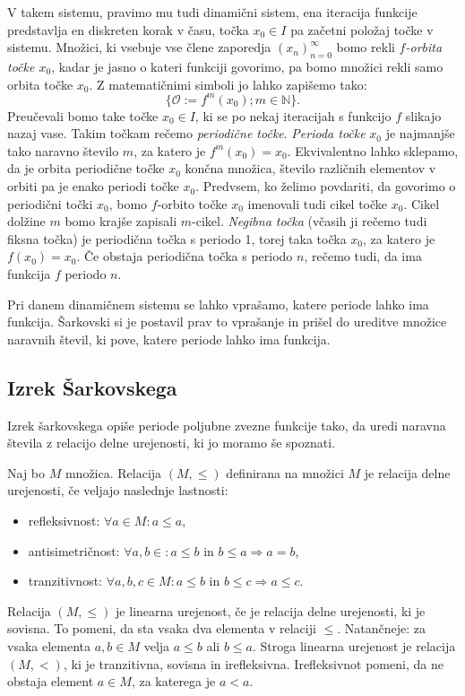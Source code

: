 \documentclass[mat2]{fmfdelo}
\newcommand{\N}{\mathbb N}
\begin{document}
V takem sistemu, pravimo mu tudi dinamični sistem, ena iteracija funkcije predstavlja en diskreten korak v času, točka $x_0 \in I$ pa začetni položaj točke v sistemu. Množici, ki vsebuje vse člene zaporedja $\left( x_n \right)_{n=0}^{\infty}$ bomo rekli \emph{$f$-orbita točke $x_0$}, kadar je jasno o kateri funkciji govorimo, pa bomo množici rekli samo orbita točke $x_0$. Z matematičnimi simboli jo lahko zapišemo tako:
$$\{ \mathcal{O} := f^m(x_0) ; m \in \N \}.$$
Preučevali bomo take točke $x_0 \in I$, ki se po nekaj iteracijah s funkcijo $f$ slikajo nazaj vase. Takim točkam rečemo \emph{periodične točke}. \emph{Perioda točke} $x_0$ je najmanjše tako naravno število $m$, za katero je $f^m(x_0) = x_0$. Ekvivalentno lahko sklepamo, da je orbita periodične točke $x_0$ končna množica, število različnih elementov v orbiti pa je enako periodi točke $x_0$. Predvsem, ko želimo povdariti, da govorimo o periodični točki $x_0$, bomo $f$-orbito točke $x_0$ imenovali tudi cikel točke $x_0$. Cikel dolžine $m$ bomo krajše zapisali $m$-cikel. \emph{Negibna točka} (včasih ji rečemo tudi fiksna točka) je periodična točka s periodo 1, torej taka točka $x_0$, za katero je $f(x_0) = x_0$. Če obstaja periodična točka s periodo $n$, rečemo tudi, da ima funkcija $f$ periodo $n$.

Pri danem dinamičnem sistemu se lahko vprašamo, katere periode lahko ima funkcija. Šarkovski si je postavil prav to vprašanje in prišel do ureditve množice naravnih števil, ki pove, katere periode lahko ima funkcija.

\subsection{Izrek Šarkovskega}
Izrek šarkovskega opiše periode poljubne zvezne funkcije tako, da uredi naravna števila z relacijo delne urejenosti, ki jo moramo še spoznati.

\begin{definicija}
Naj bo $M$ množica. Relacija $(M,\leq)$ definirana na množici $M$ je relacija delne urejenosti, če veljajo naslednje lastnosti:
\begin{itemize}
\item refleksivnost: $\forall a \in M : a \leq a$,
\item antisimetričnost:  $\forall a, b \in : a \leq b \text{ in } b \leq a \Rightarrow a = b$,
\item tranzitivnost: $\forall a, b, c \in M : a \leq b \text{ in } b \leq c \Rightarrow a \leq c$.
\end{itemize}
Relacija $(M,\leq)$ je linearna urejenost, če je relacija delne urejenosti, ki je sovisna. To pomeni, da sta vsaka dva elementa v relaciji $\leq$. Natančneje: za vsaka elementa $a, b \in M$ velja $a \leq b$ ali $b \leq a$.
Stroga linearna urejenost je relacija $(M, <)$, ki je tranzitivna, sovisna in irefleksivna. Irefleksivnot pomeni, da ne obstaja element $a \in M$, za katerega je $a<a$.
\end{definicija}
\end{document}

